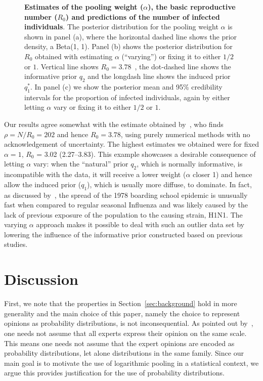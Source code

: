 \documentclass[a4paper, notitlepage, 10pt]{article}
\begin{document}
\begin{figure}[!ht]
\begin{center}
\end{center}
\caption{\textbf{Estimates of the pooling weight ($\alpha$), the basic reproductive number ($R_0$) and predictions of the number of infected individuals}.
The posterior distribution for the pooling weight $\alpha$ is shown in panel (a), where the horizontal dashed line shows the prior density, a Beta(1, 1).
Panel (b) shows the posterior distribution for $R_0$ obtained with estimating $\alpha$ (``varying'') or fixing it to either $1/2$ or $1$.
Vertical line shows $R_0 = 3.78$~\citep{Murray2002}, the dot-dashed line shows the informative prior $q_2$ and the longdash line shows the induced prior $q_1^\ast$.
In panel (c) we show the posterior mean and 95\% credibility intervals for the proportion of infected individuals, again by either letting $\alpha$ vary or fixing it to either $1/2$ or $1$.
}
\label{fig:SIR_results}
\end{figure}

Our results agree somewhat with the estimate obtained by~\cite{Murray2002}, who finds $\rho = N/R_0 = 202$ and hence $R_0 = 3.78$, using purely numerical methods with no acknowledgement of uncertainty.
The highest estimates we obtained were for fixed $\alpha = 1$, $R_0$ = 3.02 (2.27--3.83).
This example showcases a desirable consequence of letting $\alpha$ vary: when the ``natural'' prior $q_2$, which is normally informative, is incompatible with the data, it will receive a lower weight ($\alpha$ closer 1) and hence allow the induced prior ($q_1$), which is usually more diffuse, to dominate.
In fact, as discussed by~\cite{Biggerstaff2014}, the spread of the 1978 boarding school epidemic is unusually fast when compared to regular seasonal Influenza and was likely caused by the lack of previous exposure of the population to the causing strain, H1N1.
The varying $\alpha$ approach makes it possible to deal with such an outlier data set by lowering the influence of the informative prior constructed based on previous studies.

\section{Discussion}
\label{sec:discussion}

First, we note that the properties in Section~\ref{sec:background} hold in more generality and the main choice of this paper, namely the choice to represent opinions as probability distributions, is not inconsequential.
As pointed out by~\cite{French1985}, one needs not assume that all experts express their opinion on the same scale.
This means one needs not assume that the expert opinions are encoded as probability distributions, let alone distributions in the same family.
Since our main goal is to motivate the use of logarithmic pooling in a statistical context, we argue this provides justification for the use of probability distributions.
\end{document}

